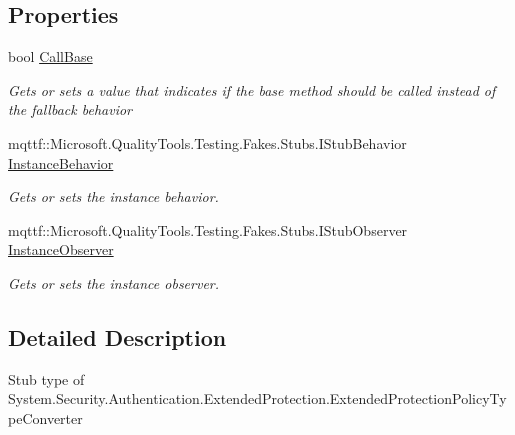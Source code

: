 \subsection*{Properties}
\begin{DoxyCompactItemize}
\item 
bool \hyperlink{class_system_1_1_security_1_1_authentication_1_1_extended_protection_1_1_fakes_1_1_stub_extendedf67afed15bbc0df07bfc91316f6f81f0_af931088646c6d953057419ea0cf5400c}{Call\-Base}
\begin{DoxyCompactList}\small\item\em Gets or sets a value that indicates if the base method should be called instead of the fallback behavior\end{DoxyCompactList}\item 
mqttf\-::\-Microsoft.\-Quality\-Tools.\-Testing.\-Fakes.\-Stubs.\-I\-Stub\-Behavior \hyperlink{class_system_1_1_security_1_1_authentication_1_1_extended_protection_1_1_fakes_1_1_stub_extendedf67afed15bbc0df07bfc91316f6f81f0_abe2bfe82902ff9e2117d686182d2a5c3}{Instance\-Behavior}
\begin{DoxyCompactList}\small\item\em Gets or sets the instance behavior.\end{DoxyCompactList}\item 
mqttf\-::\-Microsoft.\-Quality\-Tools.\-Testing.\-Fakes.\-Stubs.\-I\-Stub\-Observer \hyperlink{class_system_1_1_security_1_1_authentication_1_1_extended_protection_1_1_fakes_1_1_stub_extendedf67afed15bbc0df07bfc91316f6f81f0_a0a1b5e43fbbec2d5952189454e39c3fb}{Instance\-Observer}
\begin{DoxyCompactList}\small\item\em Gets or sets the instance observer.\end{DoxyCompactList}\end{DoxyCompactItemize}


\subsection{Detailed Description}
Stub type of System.\-Security.\-Authentication.\-Extended\-Protection.\-Extended\-Protection\-Policy\-Type\-Converter



